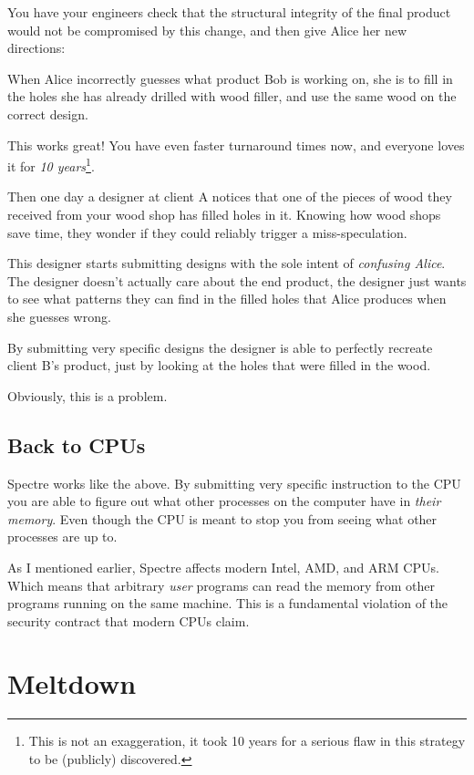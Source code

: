\documentclass{article}
\begin{document}
You have your engineers check that the structural integrity of the final product
would not be compromised by this change, and then give Alice her new directions:

When Alice incorrectly guesses what product Bob is working on, she is to fill
in the holes she has already drilled with wood filler, and use the same wood on
the correct design.

This works great! You have even faster turnaround times now, and everyone loves
it for \emph{10 years}\footnote{This is not an exaggeration, it took 10 years
for a serious flaw in this strategy to be (publicly) discovered.}.

Then one day a designer at client A notices that one of the pieces of wood they
received from your wood shop has filled holes in it. Knowing how wood shops
save time, they wonder if they could reliably trigger a miss-speculation.

This designer starts submitting designs with the sole intent of \emph{confusing
Alice}. The designer doesn't actually care about the end product, the designer
just wants to see what patterns they can find in the filled holes that Alice
produces when she guesses wrong.

By submitting very specific designs the designer is able to perfectly recreate
client B's product, just by looking at the holes that were filled in the wood.

Obviously, this is a problem.


\subsection*{Back to CPUs}


Spectre works like the above. By submitting very specific instruction to the
CPU you are able to figure out what other processes on the computer have in
\emph{their memory}. Even though the CPU is meant to stop you from seeing what
other processes are up to.

As I mentioned earlier, Spectre affects modern Intel, AMD, and ARM CPUs. Which
means that arbitrary \emph{user} programs can read the memory from other
programs running on the same machine. This is a fundamental violation of the
security contract that modern CPUs claim.

\section{Meltdown}
\end{document}

